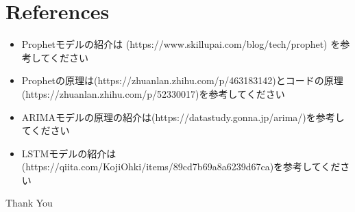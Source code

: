 \documentclass{beamer}  %
\begin{document}
\section{References}
\begin{itemize}
    \item Prophetモデルの紹介は (https://www.skillupai.com/blog/tech/prophet) を参考してください
    \item Prophetの原理は(https://zhuanlan.zhihu.com/p/463183142)とコードの原理(https://zhuanlan.zhihu.com/p/52330017)を参考してください
    \item ARIMAモデルの原理の紹介は(https://datastudy.gonna.jp/arima/)を参考してください
    \item LSTMモデルの紹介は(https://qiita.com/KojiOhki/items/89cd7b69a8a6239d67ca)を参考してください
\end{itemize}

\begin{frame}
  \begin{center}
      {\Huge\calligra Thank You}
  \end{center}
\end{frame}
\end{document}
